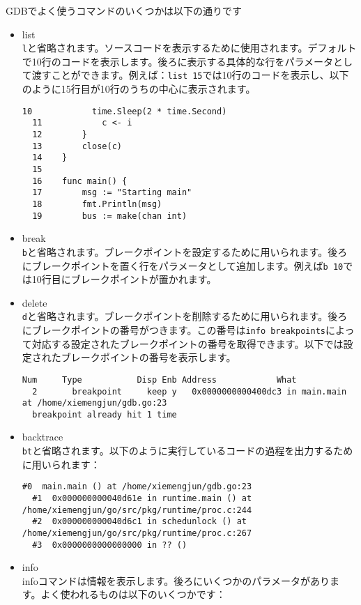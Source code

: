 GDBでよく使うコマンドのいくつかは以下の通りです

\begin{itemize}
\item list\\
  \texttt{l}と省略されます。ソースコードを表示するために使用されます。デフォルトで10行のコードを表示します。後ろに表示する具体的な行をパラメータとして渡すことができます。例えば：\texttt{list 15}では10行のコードを表示し、以下のように15行目が10行のうちの中心に表示されます。
\begin{lstlisting}[numbers=none]
  10            time.Sleep(2 * time.Second)
  11            c <- i
  12        }
  13        close(c)
  14    }
  15    
  16    func main() {
  17        msg := "Starting main"
  18        fmt.Println(msg)
  19        bus := make(chan int)
\end{lstlisting}
\item break\\
\texttt{b}と省略されます。ブレークポイントを設定するために用いられます。後ろにブレークポイントを置く行をパラメータとして追加します。例えば\texttt{b 10}では10行目にブレークポイントが置かれます。
\item delete\\
  \texttt{d}と省略されます。ブレークポイントを削除するために用いられます。後ろにブレークポイントの番号がつきます。この番号は\texttt{info breakpoints}によって対応する設定されたブレークポイントの番号を取得できます。以下では設定されたブレークポイントの番号を表示します。
\begin{lstlisting}[numbers=none]
  Num     Type           Disp Enb Address            What
  2       breakpoint     keep y   0x0000000000400dc3 in main.main at /home/xiemengjun/gdb.go:23
  breakpoint already hit 1 time
\end{lstlisting}
\item backtrace\\
  \texttt{bt}と省略されます。以下のように実行しているコードの過程を出力するために用いられます：
\begin{lstlisting}[numbers=none]
  #0  main.main () at /home/xiemengjun/gdb.go:23
  #1  0x000000000040d61e in runtime.main () at /home/xiemengjun/go/src/pkg/runtime/proc.c:244
  #2  0x000000000040d6c1 in schedunlock () at /home/xiemengjun/go/src/pkg/runtime/proc.c:267
  #3  0x0000000000000000 in ?? ()
\end{lstlisting}
\item info\\
  infoコマンドは情報を表示します。後ろにいくつかのパラメータがあります。よく使われるものは以下のいくつかです：

\end{itemize}
